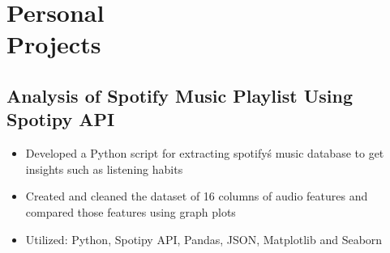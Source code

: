 \documentclass{mycv}
\begin{document}
\section{Personal \\ Projects}
\subsection{Analysis of Spotify Music Playlist Using Spotipy API}
\vspace{-\parskip}%
\begin{itemize}
	\item Developed a Python script for extracting spotify\'s music database to get insights such as listening habits
	\item Created and cleaned the dataset of 16 columns of audio features and compared those features using graph plots
	\item Utilized: Python, Spotipy API, Pandas, JSON, Matplotlib and Seaborn
\end{itemize}
\end{document}
